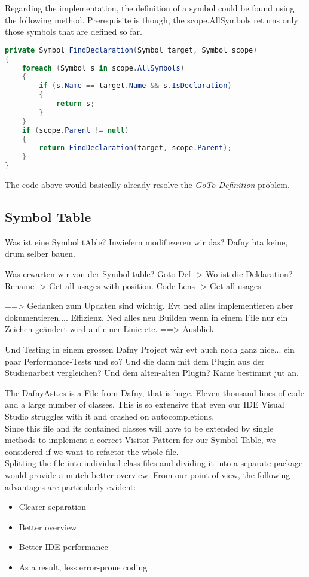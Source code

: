 Regarding the implementation, the definition of a symbol could be found using the following method. Prerequisite is though, the scope.AllSymbols returns only those symbols that are defined so far.


\begin{lstlisting}[language=csharp, caption={Finding Symbol Definition}, captionpos=b, label={lst:findsymbol}]
private Symbol FindDeclaration(Symbol target, Symbol scope)
{
    foreach (Symbol s in scope.AllSymbols)
    {
        if (s.Name == target.Name && s.IsDeclaration)
        {
            return s;
        }
    }
    if (scope.Parent != null)
    {
        return FindDeclaration(target, scope.Parent);
    }
}
\end{lstlisting}

The code above would basically already resolve the \textit{GoTo Definition} problem.

\subsection{Symbol Table}
Was ist eine Symbol tAble?
Inwiefern modifiezeren wir das?
Dafny hta keine, drum selber bauen.

Was erwarten wir von der Symbol table?
Goto Def -> Wo ist die Deklaration?
Rename -> Get all usages with position.
Code Lens -> Get all usages


==> Gedanken zum Updaten sind wichtig. Evt ned alles implementieren aber dokumentieren.... Effizienz. Ned alles neu Builden
wenn in einem File nur ein Zeichen geändert wird auf einer Linie etc. ==> Ausblick.

Und Testing in einem grossen Dafny Project wär evt auch noch ganz nice... ein paar Performance-Tests und so?
Und die dann mit dem Plugin aus der Studienarbeit vergleichen? Und dem alten-alten Plugin? Käme bestimmt jut an. 

The DafnyAst.cs is a File from Dafny, that is huge.
Eleven thousand lines of code and a large number of classes.
This is so extensive that even our IDE Visual Studio struggles with it and crashed on autocompletions. \\

Since this file and its contained classes will have to be extended by single methods
to implement a correct Visitor Pattern for our Symbol Table, we considered if we want to refactor the whole file.  \\

Splitting the file into individual class files and dividing it into a separate package would provide a mutch better overview.
From our point of view, the following advantages are particularly evident:
\begin{itemize}
    \item Clearer separation
    \item Better overview
    \item Better IDE performance
    \item As a result, less error-prone coding
\end{itemize}

